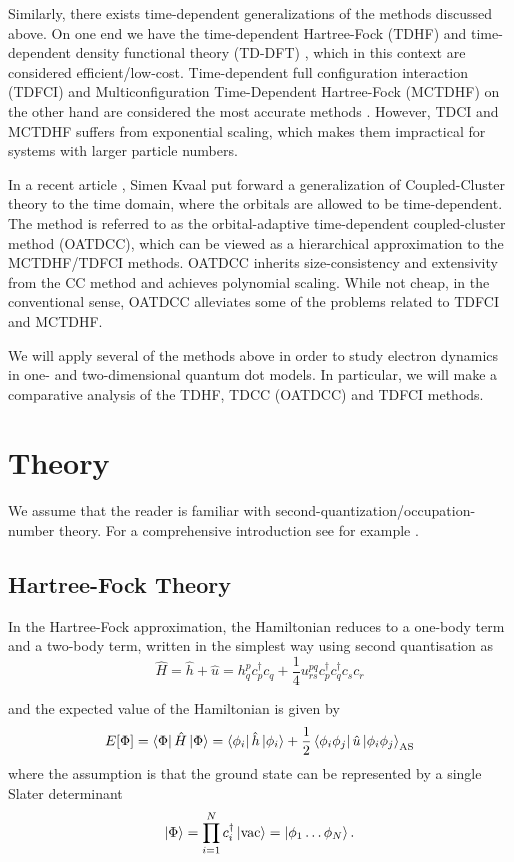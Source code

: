\documentclass[aip,jcp,reprint,floatfix]{revtex4-1}
\begin{document}
Similarly, there exists time-dependent generalizations of the methods discussed above. On one end we have the time-dependent Hartree-Fock (TDHF) and time-dependent density functional theory (TD-DFT) \cite{TDHF_2004, TD_DFT_Ullrich_Book}, which in this context are considered efficient/low-cost. 
Time-dependent full configuration interaction (TDFCI) and Multiconfiguration Time-Dependent Hartree-Fock (MCTDHF) on the other hand are considered the most accurate methods \cite{Hochstuhl2014}. However, TDCI and MCTDHF suffers from exponential scaling, which makes them impractical for systems with larger particle numbers.

In a recent article \cite{OATDCC_2012}, Simen Kvaal put forward a generalization of Coupled-Cluster theory to the time domain, where the orbitals are allowed to be time-dependent. The method is referred to as the orbital-adaptive time-dependent coupled-cluster method (OATDCC), which can be viewed as a hierarchical approximation to the MCTDHF/TDFCI methods. OATDCC inherits size-consistency and extensivity from the CC method and achieves polynomial scaling. While not cheap, in the conventional sense, OATDCC alleviates some of the problems related to TDFCI and MCTDHF.

We will apply several of the methods above in order to study electron dynamics in one- and two-dimensional quantum dot models. In particular, we will make a comparative analysis of the TDHF, TDCC (OATDCC) and TDFCI methods. 

\section{Theory}
We assume that the reader is familiar with second-quantization/occupation-number theory. For a comprehensive introduction see for example \cite{szabo1996modern,helgaker2008molecular, shavitt2009many}. 
\subsection{Hartree-Fock Theory}
In the Hartree-Fock approximation, the Hamiltonian reduces to a one-body term and a two-body term, written in the simplest way using second quantisation as
\begin{equation}
    \hat{H} = \hat{h} + \hat{u} 
    = h^{p}_{q}c^\dagger_p c_q + \frac{1}{4}u^{pq}_{rs}c^\dagger_p c^\dagger_q c_s c_r
\end{equation}

and the expected value of the Hamiltonian is given by
\begin{equation}
    \label{HF_expecation}
    E[\Phi] = \bra{\Phi}\hat{H}\ket{\Phi} 
    = \bra{\phi_i}\hat{h}\ket{\phi_i} + \frac{1}{2}\bra{\phi_i\phi_j}\hat{u}\ket{\phi_i\phi_j}_{\text{AS}}
\end{equation}
where the assumption is that the ground state can be represented by a single Slater determinant
\begin{equation}
    \ket{\Phi} = \prod_{i=1}^{N} c^\dagger_i \ket{\text{vac}} = \ket{\phi_1 \dots \phi_N}.
\end{equation}
\end{document}
